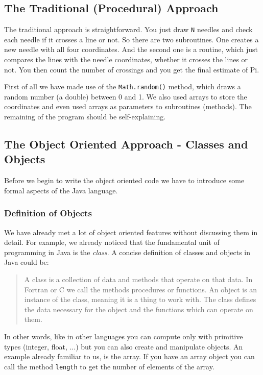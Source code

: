 \subsection{The Traditional (Procedural) Approach}
The traditional approach is straightforward. You just
draw \verb|N| needles and check each needle if it crosses a
line or not. So there are two subroutines. One creates a new
needle with all four coordinates. And the second one is a 
routine, which just compares the lines with the needle coordinates,
whether it crosses the lines or not. You then count the number
of crossings and you get the final estimate of Pi.

First of all we have made use of the \verb|Math.random()| method, which
draws a random number (a double) between 0 and 1. We also used arrays
to store the coordinates and even used arrays as parameters to
subroutines (methods). The remaining of the program should be
self-explaining.

\subsection{The Object Oriented Approach - Classes and Objects}
\label{sec:Classes_and_Objects}
Before we begin to write the object oriented code 
we have to introduce some formal aspects of the Java language.

\subsubsection{Definition of Objects}
We have already met a lot of object oriented features 
without discussing them in detail.  For example, we already noticed
that the fundamental unit of programming in Java is the {\em class}. A
concise definition of classes and objects in Java could be:
\begin{quote}
A class is a collection of data and methods that operate on that data. In
Fortran or C we call the methods procedures or functions. An object
is an instance of the class, meaning it is a thing to work with. The class
defines the data necessary for the object and the functions which can
operate on them.   
\end{quote}

In other words, like in other languages you can compute only with
primitive types (integer, float, ...) but you can also create and
manipulate objects. An example already familiar to us, is the  array. 
If you have an array 
object you can call the method \verb|length| to get the number of
elements of the array. 

